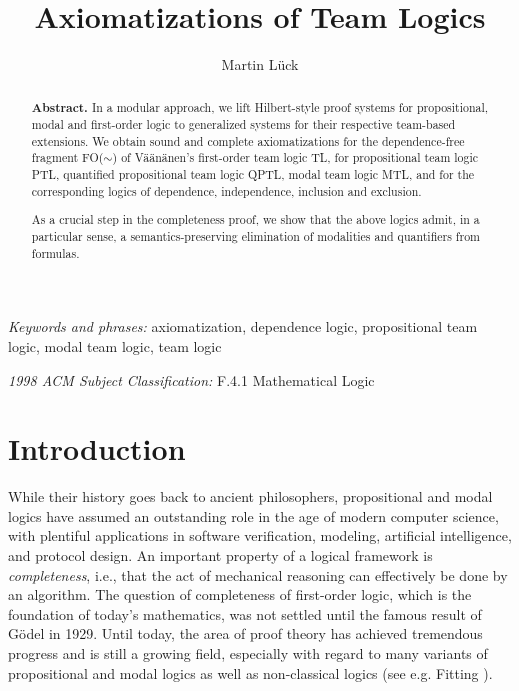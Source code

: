 \documentclass[a4paper,english,fleqn,11pt,final]{scrartcl}
\title{Axiomatizations of Team Logics}
\author{Martin Lück}
\date{\vspace{-5ex}}
\affil{\small{}Leibniz Universität Hannover, Institut für Theoretische Informatik,\\
Appelstraße 4, 30167 Hannover, Germany\\\texttt{lueck@thi.uni-hannover.de}}
\makeatletter
\newcommand{\ie}{i.e.\@\xspace}
\newcommand{\eg}{e.g.\@\xspace}
\newcommand{\negg}{{\sim}}
\theoremstyle{plain}
\theoremstyle{definition}
\makeatother
\begin{document}
\maketitle

\begin{abstract}
\textbf{Abstract.}
In a modular approach, we lift Hilbert-style proof systems for propositional, modal and first-order logic to generalized systems for their respective team-based extensions.
We obtain sound and complete axiomatizations for the dependence-free fragment FO($\negg$) of Väänänen's first-order team logic TL, for propositional team logic PTL, quantified propositional team logic QPTL, modal team logic MTL, and for the corresponding logics of dependence, independence, inclusion and exclusion.

As a crucial step in the completeness proof, we show that the above logics admit, in a particular sense, a semantics-preserving elimination of modalities and quantifiers from formulas.
\end{abstract}

\noindent\textit{Keywords and phrases:} axiomatization, dependence logic, propositional team logic, modal team logic, team logic

\noindent\textit{1998 ACM Subject Classification:} F.4.1 Mathematical Logic


\section{Introduction}

While their history goes back to ancient philosophers, propositional and modal logics have assumed an outstanding role in the age of modern computer science, with plentiful applications in software verification, modeling, artificial intelligence, and protocol design.
An important property of a logical framework is \emph{completeness}, \ie, that the act of mechanical reasoning can effectively be done by an algorithm.
The question of completeness of first-order logic, which is the foundation of today's mathematics, was not settled until the famous result of Gödel in 1929.
Until today, the area of proof theory has achieved tremendous progress and is still a growing field, especially with regard to many variants of propositional and modal logics as well as non-classical logics (see \eg Fitting \cite{fitting_proof_1983}).

\smallskip
\end{document}
